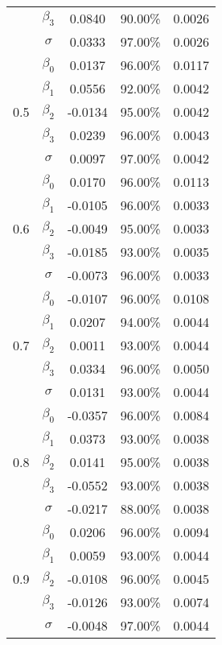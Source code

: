 \begin{longtable}[c]{|c|c|c|c|c|}
 & $\beta_3$ & 0.0840 & 90.00\% & 0.0026 \\ \cline{2-5} 
 & $\sigma$ & 0.0333 & 97.00\% & 0.0026 \\ \hline
\multirow{5}{*}{0.5} & $\beta_0$ & 0.0137 & 96.00\% & 0.0117 \\ \cline{2-5} 
 & $\beta_1$ & 0.0556 & 92.00\% & 0.0042 \\ \cline{2-5} 
 & $\beta_2$ & -0.0134 & 95.00\% & 0.0042 \\ \cline{2-5} 
 & $\beta_3$ & 0.0239 & 96.00\% & 0.0043 \\ \cline{2-5} 
 & $\sigma$ & 0.0097 & 97.00\% & 0.0042 \\ \hline
\multirow{5}{*}{0.6} & $\beta_0$ & 0.0170 & 96.00\% & 0.0113 \\ \cline{2-5} 
 & $\beta_1$ & -0.0105 & 96.00\% & 0.0033 \\ \cline{2-5} 
 & $\beta_2$ & -0.0049 & 95.00\% & 0.0033 \\ \cline{2-5} 
 & $\beta_3$ & -0.0185 & 93.00\% & 0.0035 \\ \cline{2-5} 
 & $\sigma$ & -0.0073 & 96.00\% & 0.0033 \\ \hline
\multirow{5}{*}{0.7} & $\beta_0$ & -0.0107 & 96.00\% & 0.0108 \\ \cline{2-5} 
 & $\beta_1$ & 0.0207 & 94.00\% & 0.0044 \\ \cline{2-5} 
 & $\beta_2$ & 0.0011 & 93.00\% & 0.0044 \\ \cline{2-5} 
 & $\beta_3$ & 0.0334 & 96.00\% & 0.0050 \\ \cline{2-5} 
 & $\sigma$ & 0.0131 & 93.00\% & 0.0044 \\ \hline
\multirow{5}{*}{0.8} & $\beta_0$ & -0.0357 & 96.00\% & 0.0084 \\ \cline{2-5} 
 & $\beta_1$ & 0.0373 & 93.00\% & 0.0038 \\ \cline{2-5} 
 & $\beta_2$ & 0.0141 & 95.00\% & 0.0038 \\ \cline{2-5} 
 & $\beta_3$ & -0.0552 & 93.00\% & 0.0038 \\ \cline{2-5} 
 & $\sigma$ & -0.0217 & 88.00\% & 0.0038 \\ \hline
\multirow{5}{*}{0.9} & $\beta_0$ & 0.0206 & 96.00\% & 0.0094 \\ \cline{2-5} 
 & $\beta_1$ & 0.0059 & 93.00\% & 0.0044 \\ \cline{2-5} 
 & $\beta_2$ & -0.0108 & 96.00\% & 0.0045 \\ \cline{2-5} 
 & $\beta_3$ & -0.0126 & 93.00\% & 0.0074 \\ \cline{2-5} 
 & $\sigma$ & -0.0048 & 97.00\% & 0.0044 \\ \hline
\end{longtable}

